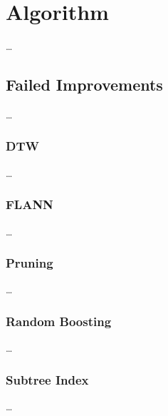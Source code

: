 \chapter{Algorithm}
\label{ch:algorithm}

\dots



\section{Failed Improvements}
\label{sec:algorithm:fail}

\dots


\subsection{DTW}
\label{ssec:algorithm:fail:dtw}

\dots


\subsection{FLANN}
\label{ssec:algorithm:fail:flann}

\dots


\subsection{Pruning}
\label{ssec:algorithm:fail:pruning}

\dots


\subsection{Random Boosting}
\label{ssec:algorithm:fail:random}

\dots


\subsection{Subtree Index}
\label{ssec:algorithm:fail:stindex}

\dots
